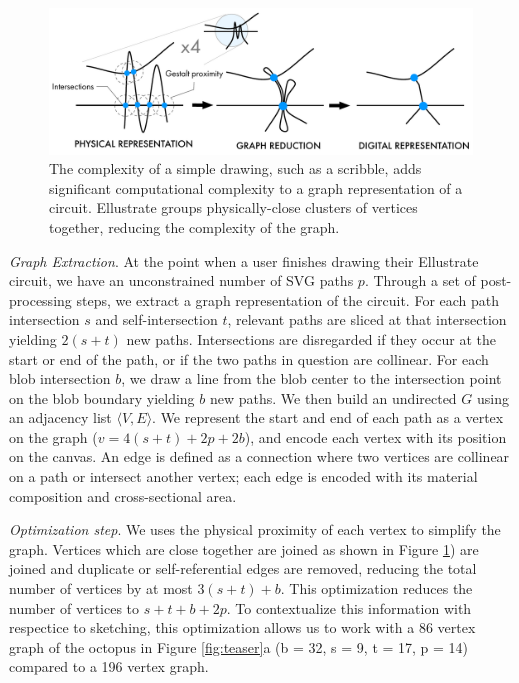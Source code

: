 \documentclass{sigchi}
\begin{document}
      \begin{figure}[t]
        \centering
        \includegraphics[width=1.0\columnwidth]{figures/gestalt.pdf}
        \caption{The complexity of a simple drawing, such as a scribble, adds significant computational complexity to a graph representation of a circuit. Ellustrate groups physically-close clusters of vertices together, reducing the complexity of the graph. }
        \label{fig:gestalt}
        \vspace{-16pt}
      \end{figure}

      \textit{Graph Extraction}.
      At the point when a user finishes drawing their Ellustrate circuit, we have an unconstrained number of SVG paths $p$. 
      Through a set of post-processing steps, we extract a graph representation of the circuit. 
      For each path intersection $s$ and self-intersection $t$, relevant paths are sliced at that intersection yielding $2(s + t)$ new paths. Intersections are disregarded if they occur at the start or end of the path, or if the two paths in question are collinear.
      For each blob intersection $b$, we draw a line from the blob center to the intersection point on the blob boundary yielding $b$ new paths.
      We then build an undirected $G$ using an adjacency list $\langle V, E \rangle$. We represent the start and end of each path as a vertex on the graph ($v = 4(s + t) + 2p + 2b $), and encode each vertex with its position on the canvas. An edge is defined as a connection where two vertices are collinear on a path or intersect another vertex; each edge is encoded with its material composition and cross-sectional area.

      \textit{Optimization step}. We uses the physical proximity of each vertex to simplify the graph. Vertices which are close together are joined as shown in Figure \ref{fig:gestalt}) are joined and duplicate or self-referential edges are removed, reducing the total number of vertices by at most $3(s + t) + b$. This optimization reduces the number of vertices to $s + t + b + 2p$. To contextualize this information with respectice to sketching, this optimization allows us to work with a 86 vertex graph of the octopus in Figure \ref{fig:teaser}a (b = 32, s = 9, t = 17, p = 14) compared to a 196 vertex graph.
\end{document}
